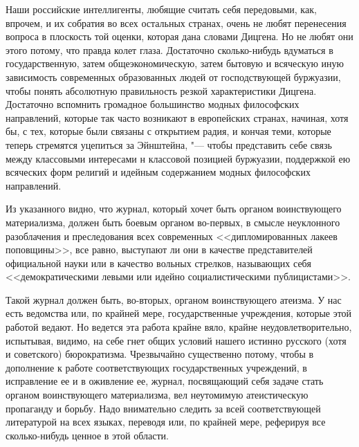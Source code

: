 Наши российские интеллигенты, любящие считать себя передовыми, как, впрочем,
и их собратия во всех остальных странах, очень не любят перенесения вопроса
в плоскость той оценки, которая дана словами Дицгена. Но не любят они этого
потому, что правда колет глаза. Достаточно сколько-нибудь вдуматься в
государственную, затем общеэкономическую, затем бытовую и всяческую иную
зависимость современных образованных людей от господствующей буржуазии,
чтобы понять абсолютную правильность резкой характеристики Дицгена.
Достаточно вспомнить громадное большинство модных философских направлений,
которые так часто возникают в европейских странах, начиная, хотя бы, с тех,
которые были связаны с открытием радия, и кончая теми, которые теперь
стремятся уцепиться за Эйнштейна, "--- чтобы представить себе связь между
классовыми интересами н классовой позицией буржуазии, поддержкой ею
всяческих форм религий и идейным содержанием модных философских
направлений.

Из указанного видно, что журнал, который хочет быть органом воинствующего
материализма, должен быть боевым органом во-первых, в смысле неуклонного
разоблачения и преследования всех современных <<дипломированных лакеев
поповщины>>, все равно, выступают ли они в качестве представителей
официальной науки или в качество вольных стрелков, называющих себя
<<демократическими левыми или идейно социалистическими публицистами>>.

Такой журнал должен быть, во-вторых, органом воинствующего атеизма. У нас
есть ведомства или, по крайней мере, государственные учреждения, которые
этой работой ведают. Но ведется эта работа крайне вяло, крайне
неудовлетворительно, испытывая, видимо, на себе гнет общих условий нашего
истинно русского (хотя и советского) бюрократизма. Чрезвычайно существенно
потому, чтобы в дополнение к работе соответствующих государственных
учреждений, в исправление ее и в оживление ее, журнал, посвящающий себя
задаче стать органом воинствующего материализма, вел неутомимую
атеистическую пропаганду и борьбу. Надо внимательно следить за всей
соответствующей литературой на всех языках, переводя или, по крайней мере,
реферируя все сколько-нибудь ценное в этой области.

